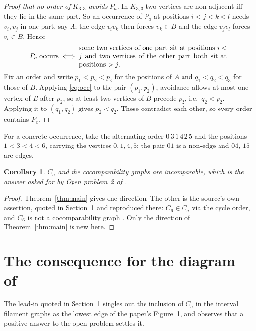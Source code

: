 \documentclass[11pt]{amsart}
\newtheorem{corollary}[theorem]{Corollary}
\theoremstyle{remark}
\newcommand{\Ca}{C_a}
\newcommand{\Pa}{P_a}
\begin{document}
\begin{proof}[Proof that no order of $K_{3,3}$ avoids $\Pa$]
In $K_{3,3}$ two vertices are non-adjacent iff they lie in the same part. So an
occurrence of $\Pa$ at positions $i<j<k<l$ needs $v_i,v_j$ in one part, say $A$;
the edge $v_iv_k$ then forces $v_k\in B$ and the edge $v_jv_l$ forces $v_l\in B$.
Hence
\begin{equation}\label{eq:occ}
  \Pa \text{ occurs} \iff
  \begin{minipage}{0.62\textwidth}
  some two vertices of one part sit at positions $i<j$ and two vertices of the
  other part both sit at positions $>j$.
  \end{minipage}
\end{equation}
Fix an order and write $p_1<p_2<p_3$ for the positions of $A$ and
$q_1<q_2<q_3$ for those of $B$. Applying \eqref{eq:occ} to the pair
$(p_1,p_2)$, avoidance allows at most one vertex of $B$ after $p_2$, so at least
two vertices of $B$ precede $p_2$, i.e.\ $q_2<p_2$. Applying it to $(q_1,q_2)$
gives $p_2<q_2$. These contradict each other, so every order contains $\Pa$.
\end{proof}

For a concrete occurrence, take the alternating order $0\,3\,1\,4\,2\,5$ and the
positions $1<3<4<6$, carrying the vertices $0,1,4,5$: the pair $01$ is a non-edge
and $04$, $15$ are edges.

\begin{corollary}\label{cor:incomparable}
$\Ca$ and the cocomparability graphs are incomparable, which is the answer asked
for by Open problem~2 of \cite{FH}.
\end{corollary}

\begin{proof}
Theorem~\ref{thm:main} gives one direction. The other is the source's own
assertion, quoted in Section~1 and reproduced there: $C_6\in\Ca$ via the cycle
order, and $C_6$ is not a cocomparability graph \cite{Gallai}. Only the direction
of Theorem~\ref{thm:main} is new here.
\end{proof}

\section{The consequence for the diagram of \cite{FH}}

The lead-in quoted in Section~1 singles out the inclusion of $\Ca$ in the interval
filament graphs as the lowest edge of the paper's Figure~1, and observes that a
positive answer to the open problem settles it.
\end{document}
